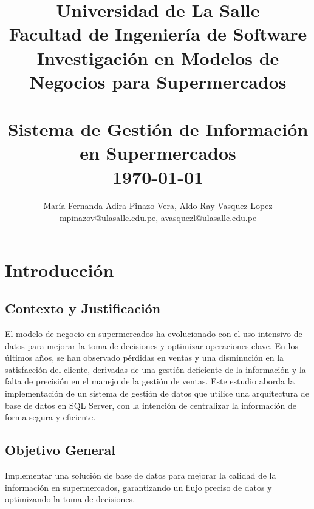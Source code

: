 \documentclass[12pt]{article}
\begin{document}
\title{ \normalsize Universidad de La Salle \\
		Facultad de Ingeniería de Software\\
		Investigación en Modelos de Negocios para Supermercados\\ [2.0cm]
		\HRule{} \\
		\LARGE \textbf{Sistema de Gestión de Información en Supermercados} %
		\HRule{} \\ [0.5cm]
		\normalsize \today \vspace*{5\baselineskip}}

\date{}

\author{
		María Fernanda Adira Pinazo Vera, Aldo Ray Vasquez Lopez \\ 
		mpinazov@ulasalle.edu.pe, avasquezl@ulasalle.edu.pe
   }
\maketitle

\clearpage  %

\tableofcontents
\newpage

\section{Introducción}

\subsection{Contexto y Justificación}
El modelo de negocio en supermercados ha evolucionado con el uso intensivo de datos para mejorar la toma de decisiones y optimizar operaciones clave. En los últimos años, se han observado pérdidas en ventas y una disminución en la satisfacción del cliente, derivadas de una gestión deficiente de la información y la falta de precisión en el manejo de la gestión de ventas. Este estudio aborda la implementación de un sistema de gestión de datos que utilice una arquitectura de base de datos en SQL Server, con la intención de centralizar la información de forma segura y eficiente.

\subsection{Objetivo General}
Implementar una solución de base de datos para mejorar la calidad de la información en supermercados, garantizando un flujo preciso de datos y optimizando la toma de decisiones.
\end{document}
